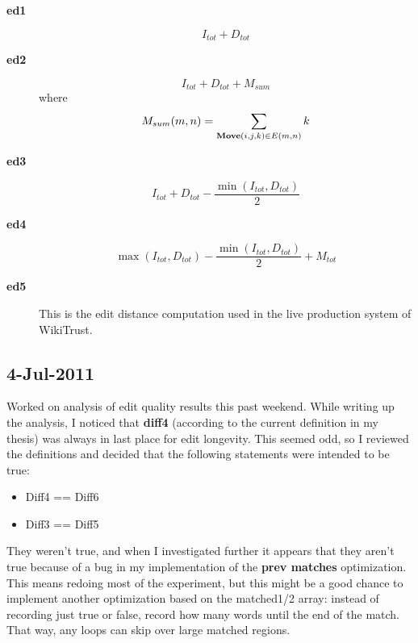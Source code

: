 \begin{description}

\item[\textbf{ed1}]
    \begin{equation*}
    I_{tot} + D_{tot}
    \end{equation*}
\item[\textbf{ed2}]
    \begin{equation*}
    I_{tot} + D_{tot} + M_{sum}
    \end{equation*}
    where
    \begin{equation*}
    M_{sum}(m,n) = \sum_{\mathbf{Move}(i, j, k) \in E(m,n)} k \\
    \end{equation*}
\item[\textbf{ed3}]
    \begin{equation*}
    I_{tot} + D_{tot} - \frac{\min(I_{tot}, D_{tot})}{2}
    \end{equation*}

\item[\textbf{ed4}]
    \begin{equation*}
    \max(I_{tot}, D_{tot}) - \frac{\min(I_{tot}, D_{tot})}{2}
                + M_{tot}
    \end{equation*}

\item[\textbf{ed5}] This is the edit distance computation used
    in the live production system of WikiTrust.

\end{description}


\subsection{4-Jul-2011}

Worked on analysis of edit quality results this past weekend.
While writing up the analysis, I noticed that \textbf{diff4}
(according to the current definition in my thesis)
was always in last place for edit longevity.
This seemed odd, so I reviewed the definitions and decided
that the following statements were intended to be true:
\begin{itemize}
\item Diff4 == Diff6
\item Diff3 == Diff5
\end{itemize}
They weren't true, and when I investigated further it
appears that they aren't true because of a bug in my implementation
of the \textbf{prev matches} optimization.
This means redoing most of the experiment,
but this might be a good chance to implement another
optimization based on the matched1/2 array:
instead of recording just true or false, record
how many words until the end of the match.
That way, any loops can skip over large matched regions.

